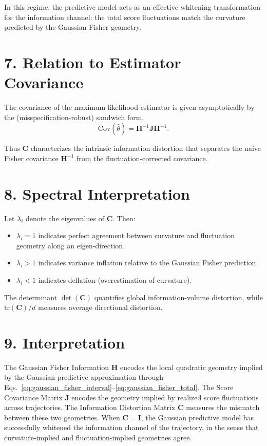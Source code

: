 \documentclass[11pt]{article}
\begin{document}
In this regime, the predictive model acts as an effective whitening transformation for the information channel:
the total score fluctuations match the curvature predicted by the Gaussian Fisher geometry.

\section*{7. Relation to Estimator Covariance}

The covariance of the maximum likelihood estimator is given asymptotically by the (misspecification-robust) sandwich form,
\begin{equation}
\mathrm{Cov}(\hat{\theta})
=
\mathbf H^{-1} \mathbf J \mathbf H^{-1}.
\end{equation}

Thus $\mathbf C$ characterizes the intrinsic information distortion that separates the naive Fisher covariance $\mathbf H^{-1}$
from the fluctuation-corrected covariance.

\section*{8. Spectral Interpretation}

Let $\lambda_i$ denote the eigenvalues of $\mathbf C$.
Then:
\begin{itemize}
\item $\lambda_i = 1$ indicates perfect agreement between curvature and fluctuation geometry along an eigen-direction.
\item $\lambda_i > 1$ indicates variance inflation relative to the Gaussian Fisher prediction.
\item $\lambda_i < 1$ indicates deflation (overestimation of curvature).
\end{itemize}

The determinant $\det(\mathbf C)$ quantifies global information-volume distortion, while $\mathrm{tr}(\mathbf C)/d$ measures
average directional distortion.

\section*{9. Interpretation}

The Gaussian Fisher Information $\mathbf H$ encodes the local quadratic geometry implied by the Gaussian predictive approximation
through Eqs.~\eqref{eq:gaussian_fisher_interval}--\eqref{eq:gaussian_fisher_total}. The Score Covariance Matrix $\mathbf J$ encodes
the geometry implied by realized score fluctuations across trajectories. The Information Distortion Matrix $\mathbf C$ measures the
mismatch between these two geometries. When $\mathbf C=\mathbf I$, the Gaussian predictive model has successfully whitened the
information channel of the trajectory, in the sense that curvature-implied and fluctuation-implied geometries agree.
\end{document}
